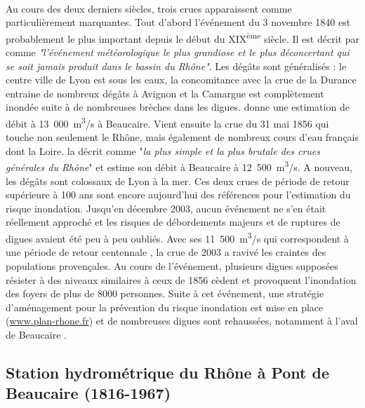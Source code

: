 	\paragraph{} Au cours des deux derniers siècles, trois crues apparaissent comme particulièrement marquantes. Tout d'abord l'événement du 3 novembre 1840 est probablement le plus important depuis le début du XIX\textsuperscript{ème} siècle. Il est décrit par \citet{parde_regime_1925} comme \textit{"l'événement météorologique le plus grandiose et le plus déconcertant qui se soit jamais produit dans le bassin du Rhône"}. Les dégâts sont généralisés : le centre ville de Lyon est sous les eaux, la concomitance avec la crue de la Durance entraine de nombreux dégâts à Avignon et la Camargue est complètement inondée suite à de nombreuses brèches dans les digues. \citet{parde_regime_1925} donne une estimation de débit à 13~000~m\textsuperscript{3}/s à Beaucaire. Vient ensuite la crue du 31 mai 1856 qui touche non seulement le Rhône, mais également de nombreux cours d'eau français dont la Loire. \citet{parde_regime_1925} la décrit comme "\textit{la plus simple et la plus brutale des crues générales du Rhône}" et estime son débit à Beaucaire à 12~500~m\textsuperscript{3}/s. A nouveau, les dégâts sont colossaux de Lyon à la mer. Ces deux crues de période de retour supérieure à 100 ans sont encore aujourd'hui des références pour l'estimation du risque inondation. Jusqu'en décembre 2003, aucun événement ne s'en était réellement approché et les risques de débordements majeurs et de ruptures de digues avaient été peu à peu oubliés. Avec ses 11~500~m\textsuperscript{3}/s qui correspondent à une période de retour centennale \citep{medd_debit_2005}, la crue de 2003 a ravivé les craintes des populations provençales. Au cours de l'événement, plusieurs digues supposées résister à des niveaux similaires à ceux de 1856 cèdent et provoquent l'inondation des foyers de plus de 8000 personnes. Suite à cet événement, une stratégie d'aménagement pour la prévention du risque inondation est mise en place (\url{www.plan-rhone.fr}) et de nombreuses digues sont rehaussées, notamment à l'aval de Beaucaire \citep{symadrem_programme_2012}. 
	
	
\FloatBarrier

	\subsection{Station hydrométrique du Rhône à Pont de Beaucaire (1816-1967)}
		
